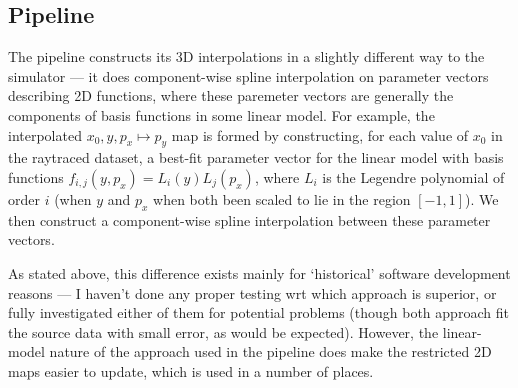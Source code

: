 
\subsection{Pipeline}

The pipeline constructs its 3D interpolations in a slightly
different way to the simulator --- it does component-wise spline interpolation
on parameter vectors describing 2D functions, where these paremeter vectors
are generally the components of basis functions in some linear model.
For example, the interpolated $x_0, y, p_x \mapsto p_y$ map is formed by
constructing, for each value of $x_0$ in the raytraced dataset, a best-fit
parameter vector for the linear model with basis functions $f_{i,j}(y, p_x) = L_i (y) L_j (p_x)$, where $L_i$ is the Legendre polynomial of order $i$ (when $y$
and $p_x$ when both been scaled to lie in the region $[-1,1]$). We then construct
a component-wise spline interpolation between these parameter vectors.

As stated above, this difference exists mainly for `historical' software development
reasons --- I haven't done any proper testing wrt which approach is superior, or
fully investigated either of them for potential problems (though both approach
fit the source data with small error, as would be expected). However, the linear-model
nature of the approach used in the pipeline does make the restricted 2D maps easier to update,
which is used in a number of places.
